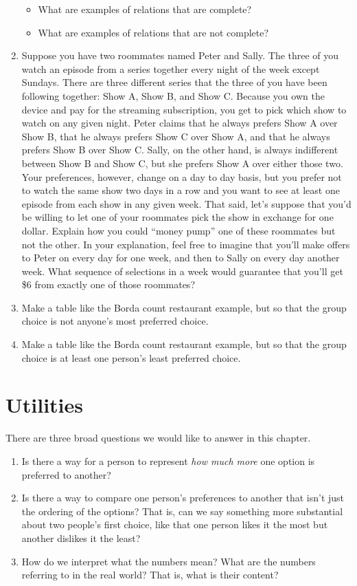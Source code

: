 \documentclass[]{tufte-book}
\providecommand{\tightlist}{%
  \setlength{\itemsep}{0pt}\setlength{\parskip}{0pt}}
\begin{document}
\begin{enumerate}
  \begin{itemize}
  \tightlist
  \item
    What are examples of relations that are complete?
  \item
    What are examples of relations that are not complete?
  \end{itemize}
\item
   Suppose you have two roommates named Peter and Sally. The three of you watch an episode from a series together every night of the week except Sundays. There are three different series that the three of you have been following together: Show A, Show B, and Show C. Because you own the device and pay for the streaming subscription, you get to pick which show to watch on any given night. Peter claims that he always prefers Show A over Show B, that he always prefers Show C over Show A, and that he always prefers Show B over Show C. Sally, on the other hand, is always indifferent between Show B and Show C, but she prefers Show A over either those two. Your preferences, however, change on a day to day basis, but you prefer not to watch the same show two days in a row and you want to see at least one episode from each show in any given week. That said, let's suppose that you'd be willing to let one of your roommates pick the show in exchange for one dollar. Explain how you could ``money pump'' one of these roommates but not the other. In your explanation, feel free to imagine that you'll make offers to Peter on every day for one week, and then to Sally on every day another week. What sequence of selections in a week would guarantee that you'll get \$6 from exactly one of those roommates?
\item
  Make a table like the Borda count restaurant example, but so that the group choice is not anyone's most preferred choice.
\item
  Make a table like the Borda count restaurant example, but so that the group choice is at least one person's least preferred choice.
\end{enumerate}

\hypertarget{utilities}{%
\chapter{Utilities}\label{utilities}}

There are three broad questions we would like to answer in this chapter.

\begin{enumerate}
\def\labelenumi{\arabic{enumi}.}
\item
  Is there a way for a person to represent \emph{how much more} one option is preferred to another?
\item
  Is there a way to compare one person's preferences to another that isn't just the ordering of the options? That is, can we say something more substantial about two people's first choice, like that one person likes it the most but another dislikes it the least?
\item
  How do we interpret what the numbers mean? What are the numbers referring to in the real world? That is, what is their content?
\end{enumerate}
\end{document}
